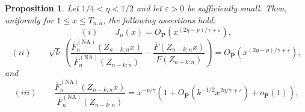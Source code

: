 \documentclass[reqno,openbib,runningheads,a4paper,12pt]{amsart}%
\newtheorem{proposition}{Proposition}[section]
\begin{document}
\begin{proposition}
\label{prop:app-stochastic} Let $1/4<\eta<1/2$ and let $\varepsilon>0$ be
sufficiently small. Then, uniformly for $1\leq x\leq T_{n,a}$, the following
assertions hold:
\[
(i)\qquad J_{n}(x)=O_{\mathbf{P}}\!\left(  x^{(2\eta-p)/\gamma+\varepsilon
}\right)  ,
\]%
\[
(ii)\qquad\sqrt{k}\,\left(  \frac{\overline{F}_{n}^{(\mathrm{NA})}%
(Z_{n-k:n}x)}{\overline{F}_{n}^{(\mathrm{NA})}(Z_{n-k:n})}-\frac{\overline
{F}(Z_{n-k:n}x)}{\overline{F}(Z_{n-k:n})}\right)  =O_{\mathbf{P}}\!\left(
x^{(2\eta-p)/\gamma+\varepsilon}\right)  ,
\]
and
\[
(iii)\qquad\frac{\overline{F}_{n}^{(\mathrm{NA})}(Z_{n-k:n}x)}{\overline
{F}_{n}^{(\mathrm{NA})}(Z_{n-k:n})}=x^{-p/\gamma}\left(  1+O_{\mathbf{P}%
}\!\left(  k^{-1/2}x^{2\eta/\gamma+\varepsilon}\right)  +o_{\mathbf{P}%
}(1)\right)  ,
\]

\end{proposition}
\end{document}
